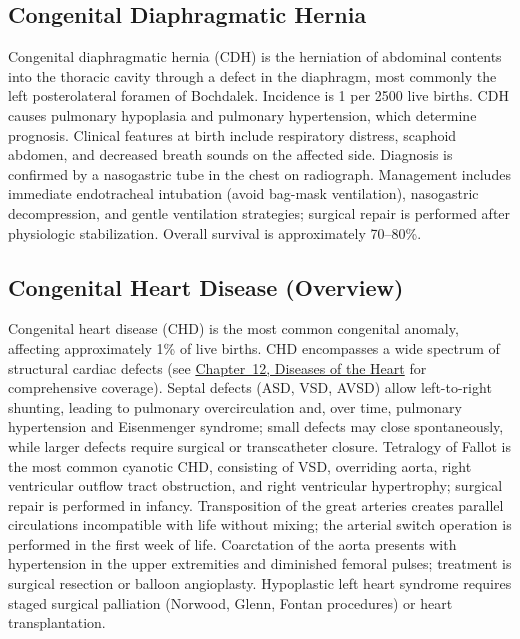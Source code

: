 



\label{sec:Perinatal Conditions}

\subsection{Congenital Diaphragmatic Hernia}
\label{sec:Congenital Diaphragmatic Hernia}
Congenital diaphragmatic hernia (CDH) is the herniation of abdominal contents into the thoracic cavity through a defect in the diaphragm, most commonly the left posterolateral foramen of Bochdalek. Incidence is 1 per 2500 live births. CDH causes pulmonary hypoplasia and pulmonary hypertension, which determine prognosis. Clinical features at birth include respiratory distress, scaphoid abdomen, and decreased breath sounds on the affected side. Diagnosis is confirmed by a nasogastric tube in the chest on radiograph. Management includes immediate endotracheal intubation (avoid bag-mask ventilation), nasogastric decompression, and gentle ventilation strategies; surgical repair is performed after physiologic stabilization. Overall survival is approximately 70--80\%.

\subsection{Congenital Heart Disease (Overview)}
\label{sec:Congenital Heart Disease}
Congenital heart disease (CHD) is the most common congenital anomaly, affecting approximately 1\% of live births. CHD encompasses a wide spectrum of structural cardiac defects (see \hyperref[ch:heart]{Chapter~12, Diseases of the Heart} for comprehensive coverage). Septal defects (ASD, VSD, AVSD) allow left-to-right shunting, leading to pulmonary overcirculation and, over time, pulmonary hypertension and Eisenmenger syndrome; small defects may close spontaneously, while larger defects require surgical or transcatheter closure. Tetralogy of Fallot is the most common cyanotic CHD, consisting of VSD, overriding aorta, right ventricular outflow tract obstruction, and right ventricular hypertrophy; surgical repair is performed in infancy. Transposition of the great arteries creates parallel circulations incompatible with life without mixing; the arterial switch operation is performed in the first week of life. Coarctation of the aorta presents with hypertension in the upper extremities and diminished femoral pulses; treatment is surgical resection or balloon angioplasty. Hypoplastic left heart syndrome requires staged surgical palliation (Norwood, Glenn, Fontan procedures) or heart transplantation.

